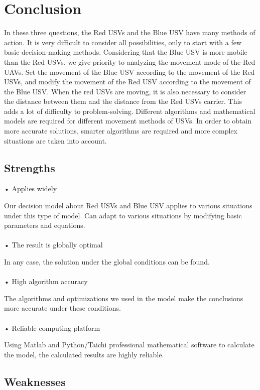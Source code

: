 \documentclass{mcmthesis}
\begin{document}
\section{Conclusion}
In these three questions, the Red USVs and the Blue USV have many methods of action. It is very difficult to consider all possibilities, only to start with a few basic decision-making methods. Considering that the Blue USV is more mobile than the Red USVs, we give priority to analyzing the movement mode of the Red UAVs. Set the movement of the Blue USV according to the movement of the Red USVs, and modify the movement of the Red USV according to the movement of the Blue USV. When the red USVs are moving, it is also necessary to consider the distance between them and the distance from the Red USVs carrier. This adds a lot of difficulty to problem-solving. Different algorithms and mathematical models are required for different movement methods of USVs. In order to obtain more accurate solutions, smarter algorithms are required and more complex situations are taken into account.

\subsection{Strengths}

• Applies widely \par
	Our decision model about Red USVs and Blue USV applies to various situations under this type of model. Can adapt to various situations by modifying basic parameters and equations. \\ \\
• The result is globally optimal \par
	In any case, the solution under the global conditions can be found. \\ \\
• High algorithm accuracy \par
	The algorithms and optimizations we used in the model make the conclusions more accurate under these conditions.\\ \\
• Reliable computing platform \par
	Using Matlab and Python/Taichi professional mathematical software to calculate the model, the calculated results are highly reliable. \\
\subsection{Weaknesses}
\end{document}
